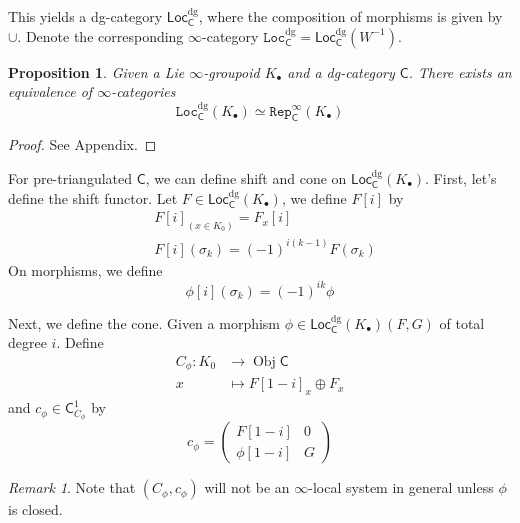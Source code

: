 \documentclass[12pt]{amsart}
\newtheorem{prop}[thm]{Proposition}
\theoremstyle{definition}
\theoremstyle{remark}
\newtheorem{rem}[thm]{Remark}
\numberwithin{equation}{section}
\newcommand{\CC}{{\mathsf C}}
\newcommand{\1}{{\mathbb{1}}}
\newcommand{\ob}{\operatorname{Obj}}
\newcommand{\Loc}{\mathsf{Loc}}
\newcommand{\repi}{\mathtt{Rep}}
\newcommand{\loci}{\mathtt{Loc}}
\newcommand{\bt}{\bullet}
\newcommand{\dg}{{\operatorname{dg}}}
\begin{document}
This yields a dg-category $\Loc^{\dg}_{\CC}$, where the composition of morphisms is given by $\cup$. Denote the corresponding $\infty$-category $\loci^{\dg}_{\CC} = \Loc^{\dg}_{\CC}(W^{-1})$.

\begin{prop}
Given a Lie $\infty$-groupoid $K_{\bullet}$ and a dg-category $\CC$. There exists an equivalence of $\infty$-categories
\begin{equation*}
    \loci^{\dg}_{\CC}(K_{\bullet}) \simeq \repi^{\infty}_{\CC}(K_{\bullet})
\end{equation*}
\end{prop}
\begin{proof}
 See \cite{Smi11} Appendix.
\end{proof}

For pre-triangulated $\CC$, we can define shift and cone on $\Loc^{\dg}_{\CC}(K_{\bt})$.
First, let's define the shift functor. Let $F\in \Loc^{\dg}_{\CC}(K_{\bt})$, we define $F[i]$ by
\begin{align*}
    &F[i]_{(x\in K_0)} = F_x[i]\\
&F[i](\sigma_k) = (-1)^{i(k - 1)} F(\sigma_k)
\end{align*}
On morphisms, we define
$$
\phi[i](\sigma_k) = (-1)^{ik} \phi
$$

Next, we define the cone. Given a morphism $\phi \in \Loc^{\dg}_{\CC}(K_{\bt})(F, G)$ of total degree $i$. Define  
\begin{align*}
    C_{\phi}: K_0&\to \ob\CC\\
    x &\mapsto F[1-i]_x \oplus F_x
\end{align*}
and $c_{\phi} \in \CC^1_{C_{\phi}}$ by
$$
c_{\phi} = \begin{pmatrix}
F[1-i] & 0\\
\phi[1-i] & G
\end{pmatrix}
$$
\begin{rem}
    Note that $(C_{\phi}, c_{\phi})$ will not be an $\infty$-local system in general unless $\phi$ is closed.
\end{rem}
\end{document}
